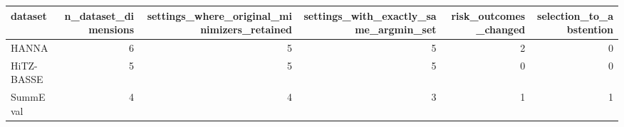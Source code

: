 \begin{tabular}{lrrrrr}
\toprule
dataset & n\_dataset\_dimensions & settings\_where\_original\_minimizers\_retained & settings\_with\_exactly\_same\_argmin\_set & risk\_outcomes\_changed & selection\_to\_abstention \\
\midrule
HANNA & 6 & 5 & 5 & 2 & 0 \\
HiTZ-BASSE & 5 & 5 & 5 & 0 & 0 \\
SummEval & 4 & 4 & 3 & 1 & 1 \\
\bottomrule
\end{tabular}
